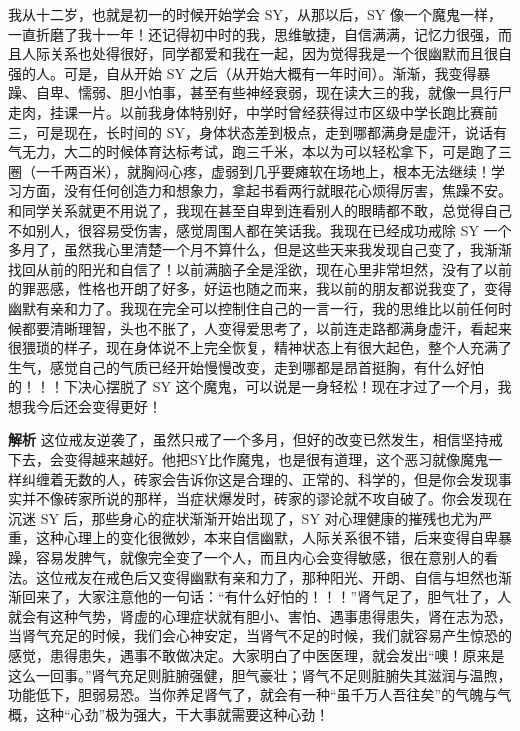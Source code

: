 \begin{case}
    我从十二岁，也就是初一的时候开始学会 SY，从那以后，SY 像一个魔鬼一样，一直折磨了我十一年！还记得初中时的我，思维敏捷，自信满满，记忆力很强，而且人际关系也处得很好，同学都爱和我在一起，因为觉得我是一个很幽默而且很自强的人。可是，自从开始 SY 之后（从开始大概有一年时间）。渐渐，我变得暴躁、自卑、懦弱、胆小怕事，甚至有些神经衰弱，现在读大三的我，就像一具行尸走肉，挂课一片。以前我身体特别好，中学时曾经获得过市区级中学长跑比赛前三，可是现在，长时间的 SY，身体状态差到极点，走到哪都满身是虚汗，说话有气无力，大二的时候体育达标考试，跑三千米，本以为可以轻松拿下，可是跑了三圈（一千两百米），就胸闷心疼，虚弱到几乎要瘫软在场地上，根本无法继续！学习方面，没有任何创造力和想象力，拿起书看两行就眼花心烦得厉害，焦躁不安。和同学关系就更不用说了，我现在甚至自卑到连看别人的眼睛都不敢，总觉得自己不如别人，很容易受伤害，感觉周围人都在笑话我。我现在已经成功戒除 SY 一个多月了，虽然我心里清楚一个月不算什么，但是这些天来我发现自己变了，我渐渐找回从前的阳光和自信了！以前满脑子全是淫欲，现在心里非常坦然，没有了以前的罪恶感，性格也开朗了好多，好运也随之而来，我以前的朋友都说我变了，变得幽默有亲和力了。我现在完全可以控制住自己的一言一行，我的思维比以前任何时候都要清晰理智，头也不胀了，人变得爱思考了，以前连走路都满身虚汗，看起来很猥琐的样子，现在身体说不上完全恢复，精神状态上有很大起色，整个人充满了生气，感觉自己的气质已经开始慢慢改变，走到哪都是昂首挺胸，有什么好怕的！！！下决心摆脱了 SY 这个魔鬼，可以说是一身轻松！现在才过了一个月，我想我今后还会变得更好！

    \textbf{解析} 这位戒友逆袭了，虽然只戒了一个多月，但好的改变已然发生，相信坚持戒下去，会变得越来越好。他把SY比作魔鬼，也是很有道理，这个恶习就像魔鬼一样纠缠着无数的人，砖家会告诉你这是合理的、正常的、科学的，但是你会发现事实并不像砖家所说的那样，当症状爆发时，砖家的谬论就不攻自破了。你会发现在沉迷 SY 后，那些身心的症状渐渐开始出现了，SY 对心理健康的摧残也尤为严重，这种心理上的变化很微妙，本来自信幽默，人际关系很不错，后来变得自卑暴躁，容易发脾气，就像完全变了一个人，而且内心会变得敏感，很在意别人的看法。这位戒友在戒色后又变得幽默有亲和力了，那种阳光、开朗、自信与坦然也渐渐回来了，大家注意他的一句话：“有什么好怕的！！！”肾气足了，胆气壮了，人就会有这种气势，肾虚的心理症状就有胆小、害怕、遇事患得患失，肾在志为恐，当肾气充足的时候，我们会心神安定，当肾气不足的时候，我们就容易产生惊恐的感觉，患得患失，遇事不敢做决定。大家明白了中医医理，就会发出“噢！原来是这么一回事。”肾气充足则脏腑强健，胆气豪壮；肾气不足则脏腑失其滋润与温煦，功能低下，胆弱易恐。当你养足肾气了，就会有一种“虽千万人吾往矣”的气魄与气概，这种“心劲”极为强大，干大事就需要这种心劲！
\end{case}

